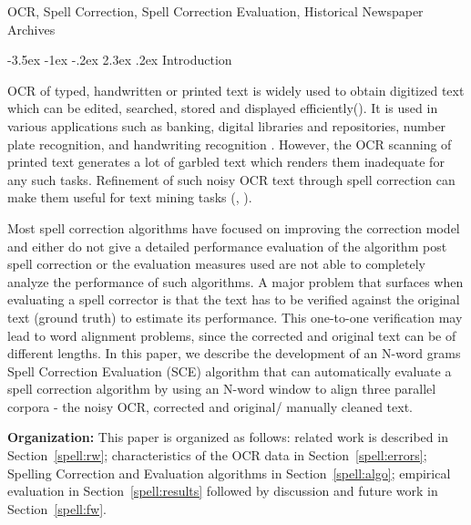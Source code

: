 \documentclass[12pt]{article}
\makeatletter
\renewcommand\section{\@startsection{section}{1}{\z@}%
                                  {-3.5ex \@plus -1ex \@minus -.2ex}%
                                  {2.3ex \@plus.2ex}%
                                  {\normalfont\bfseries}}
\makeatother
\begin{document}
 OCR, Spell Correction, Spell Correction Evaluation, Historical Newspaper Archives



\section{Introduction}

OCR of typed, handwritten or printed text is widely used to obtain digitized text which can be edited, searched, stored and displayed efficiently(\cite{torget2011mapping,palfray2012logical}). It is used in various applications such as banking, digital libraries \cite{mcmurdo2013vermont} and repositories, number plate recognition, and handwriting recognition \cite{singh2012survey}. However, the OCR scanning of printed text generates a lot of garbled text which renders them inadequate for any such tasks. Refinement of such noisy OCR text through spell correction can make them useful for text mining tasks (\cite{dutta2011learning}, \cite{yang2011topic}).

Most spell correction algorithms have focused on improving the correction model and either do not give a detailed performance evaluation of the algorithm post spell correction or the evaluation measures used are not able to completely analyze the performance of such algorithms.  
A major problem that surfaces when evaluating a spell corrector is that the text has to be verified against the original text (ground truth) to estimate its performance. This one-to-one verification may lead to word alignment problems, since the corrected and original text can be of different lengths.
In this paper, we describe the development of an N-word grams Spell Correction Evaluation (SCE) algorithm that can automatically evaluate a spell correction algorithm by using an N-word window to align three parallel corpora - the noisy OCR, corrected and original/ manually cleaned text. 

\noindent \textbf{Organization: } This paper is organized as follows: related work is described in Section~\ref{spell:rw}; characteristics of the OCR data in Section~\ref{spell:errors}; Spelling Correction and Evaluation algorithms in Section~\ref{spell:algo}; empirical evaluation in Section~\ref{spell:results} followed by discussion and future work in Section~\ref{spell:fw}. 
\end{document}
